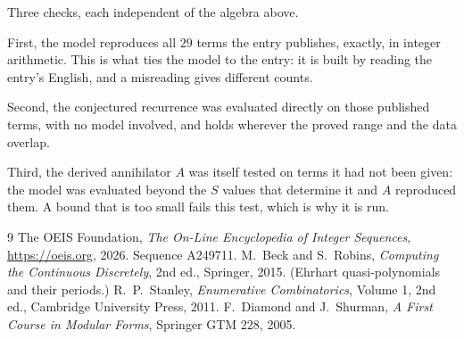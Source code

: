 \documentclass[11pt,a4paper]{article}
\theoremstyle{plain}
\theoremstyle{definition}
\begin{document}
Three checks, each independent of the algebra above.

First, the model reproduces all $29$ terms the entry publishes, exactly, in integer
arithmetic. This is what ties the model to the entry: it is built by reading the entry's
English, and a misreading gives different counts.

Second, the conjectured recurrence was evaluated directly on those published terms, with no
model involved, and holds wherever the proved range and the data overlap.

Third, the derived annihilator $A$ was itself tested on terms it had not been given: the model
was evaluated beyond the $S$ values that determine it and $A$ reproduced them. A bound that is
too small fails this test, which is why it is run.

\begin{thebibliography}{9}
 The OEIS Foundation, \emph{The On-Line Encyclopedia of Integer
Sequences}, \url{https://oeis.org}, 2026. Sequence A249711.
 M.~Beck and S.~Robins, \emph{Computing the Continuous Discretely},
2nd ed., Springer, 2015. (Ehrhart quasi-polynomials and their periods.)
 R.~P.~Stanley, \emph{Enumerative Combinatorics}, Volume 1, 2nd ed.,
Cambridge University Press, 2011.
 F.~Diamond and J.~Shurman, \emph{A First Course in Modular Forms},
Springer GTM 228, 2005.
\end{thebibliography}
\end{document}
